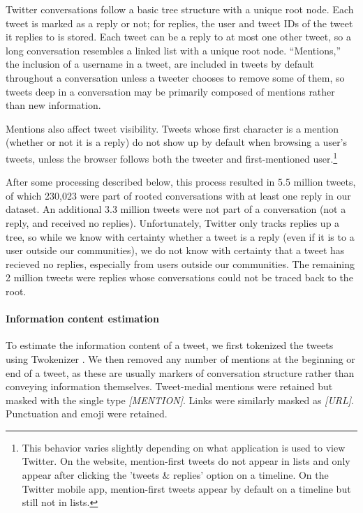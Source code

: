 \documentclass[11pt,letterpaper]{article}
\begin{document}
Twitter conversations follow a basic tree structure with a unique root node. Each tweet is marked as a reply or not; for replies, the user and tweet IDs of the tweet it replies to is stored. Each tweet can be a reply to at most one other tweet, so a long conversation resembles a linked list with a unique root node. ``Mentions,'' the inclusion of a username in a tweet, are included in tweets by default throughout a conversation unless a tweeter chooses to remove some of them, so tweets deep in a conversation may be primarily composed of mentions rather than new information.

Mentions also affect tweet visibility.  Tweets whose first character is a mention (whether or not it is a reply) do not show up by default when browsing a user's tweets, unless the browser follows both the tweeter and first-mentioned user.\footnote{This behavior varies slightly depending on what application is used to view Twitter.  On the website, mention-first tweets do not appear in lists and only appear after clicking the 'tweets \& replies' option on a timeline. On the Twitter mobile app, mention-first tweets appear by default on a timeline but still not in lists.}

After some processing described below, this process resulted in 5.5 million tweets, of which 230,023 were part of rooted conversations with at least one reply in our dataset. An additional 3.3 million tweets were not part of a conversation (not a reply, and received no replies).  Unfortunately, Twitter only tracks replies up a tree, so while we know with certainty whether a tweet is a reply (even if it is to a user outside our communities), we do not know with certainty that a tweet has recieved no replies, especially from users outside our communities.  The remaining 2 million tweets were replies whose conversations could not be traced back to the root.


\paragraph{Information content estimation}

To estimate the information content of a tweet, we first tokenized the tweets using Twokenizer \cite{owoputi2013}. We then removed any number of mentions at the beginning or end of a tweet, as these are usually markers of conversation structure rather than conveying information themselves.  Tweet-medial mentions were retained but masked with the single type {\it [MENTION]}. Links were similarly masked as {\it [URL]}. Punctuation and emoji were retained.
\end{document}
